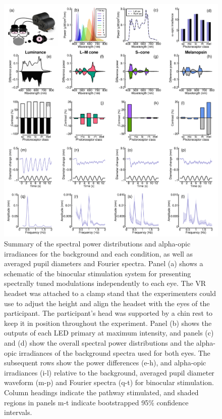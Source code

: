 \documentclass[
]{article}
\begin{document}
\begin{figure}

{\centering \includegraphics[width=0.8\linewidth]{Figures/methodsfig} 

}

\caption{Summary of the spectral power distributions and alpha-opic irradiances for the background and each condition, as well as averaged pupil diameters and Fourier spectra. Panel (a) shows a schematic of the binocular stimulation system for presenting spectrally tuned modulations independently to each eye. The VR headset was attached to a clamp stand that the experimenters could use to adjust the height and align the headset with the eyes of the participant. The participant's head was supported by a chin rest to keep it in position throughout the experiment. Panel (b) shows the outputs of each LED primary at maximum intensity, and panels (c) and (d) show the overall spectral power distributions and the alpha-opic irradiances of the background spectra used for both eyes. The subsequent rows show the power differences (e-h), and alpha-opic irradiances (i-l) relative to the background, averaged pupil diameter waveform (m-p) and Fourier spectra (q-t) for binocular stimulation. Column headings indicate the pathway stimulated, and shaded regions in panels m-t indicate bootstrapped 95\% confidence intervals.}\label{fig:spectraplots}
\end{figure}
\end{document}
